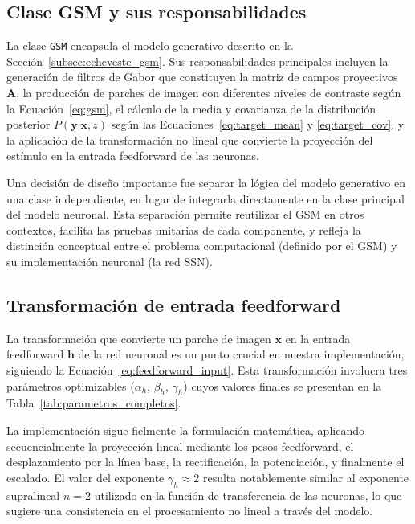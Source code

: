\subsection{Clase GSM y sus responsabilidades}
\label{subsec:impl_gsm_clase}

La clase \texttt{GSM} encapsula el modelo generativo descrito en la Sección~\ref{subsec:echeveste_gsm}. Sus responsabilidades principales incluyen la generación de filtros de Gabor que constituyen la matriz de campos proyectivos $\mathbf{A}$, la producción de parches de imagen con diferentes niveles de contraste según la Ecuación~\ref{eq:gsm}, el cálculo de la media y covarianza de la distribución posterior $P(\mathbf{y}|\mathbf{x}, z)$ según las Ecuaciones~\ref{eq:target_mean} y \ref{eq:target_cov}, y la aplicación de la transformación no lineal que convierte la proyección del estímulo en la entrada feedforward de las neuronas.

Una decisión de diseño importante fue separar la lógica del modelo generativo en una clase independiente, en lugar de integrarla directamente en la clase principal del modelo neuronal. Esta separación permite reutilizar el GSM en otros contextos, facilita las pruebas unitarias de cada componente, y refleja la distinción conceptual entre el problema computacional (definido por el GSM) y su implementación neuronal (la red SSN).

\subsection{Transformación de entrada feedforward}
\label{subsec:impl_gsm_h}

La transformación que convierte un parche de imagen $\mathbf{x}$ en la entrada feedforward $\mathbf{h}$ de la red neuronal es un punto crucial en nuestra implementación, siguiendo la Ecuación~\ref{eq:feedforward_input}. Esta transformación involucra tres parámetros optimizables ($\alpha_h$, $\beta_h$, $\gamma_h$) cuyos valores finales se presentan en la Tabla~\ref{tab:parametros_completos}.

La implementación sigue fielmente la formulación matemática, aplicando secuencialmente la proyección lineal mediante los pesos feedforward, el desplazamiento por la línea base, la rectificación, la potenciación, y finalmente el escalado. El valor del exponente $\gamma_h \approx 2$ resulta notablemente similar al exponente supralineal $n = 2$ utilizado en la función de transferencia de las neuronas, lo que sugiere una consistencia en el procesamiento no lineal a través del modelo.

